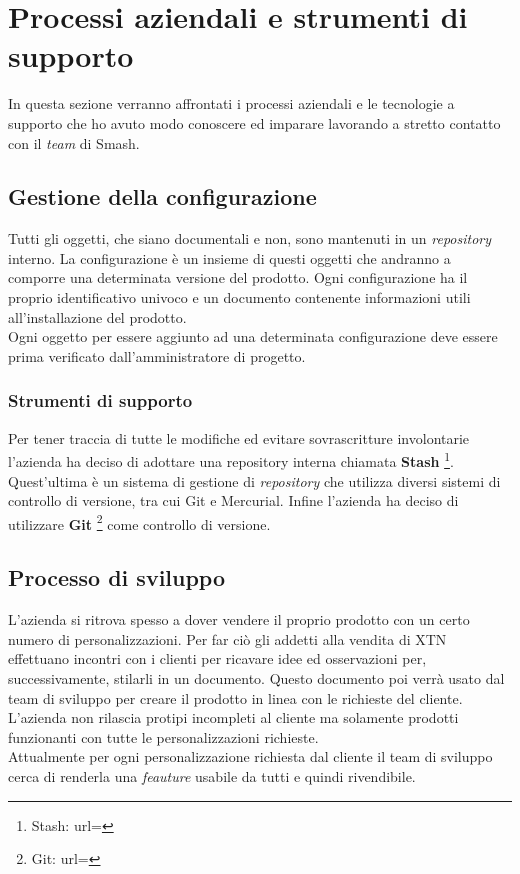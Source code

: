 \section{Processi aziendali e strumenti di supporto}
In questa sezione verranno affrontati i processi aziendali e le tecnologie a supporto che ho avuto modo conoscere ed imparare lavorando a stretto contatto con il \textit{team} di Smash\textregistered.

\subsection{Gestione della configurazione}
Tutti gli oggetti, che siano documentali e non, sono mantenuti in un \textit{repository} interno. La configurazione è un insieme di questi oggetti che andranno a comporre una determinata versione del prodotto. Ogni configurazione ha il proprio identificativo univoco e un documento contenente informazioni utili all'installazione del prodotto.\\
Ogni oggetto per essere aggiunto ad una determinata configurazione deve essere prima verificato dall'amministratore di progetto.
\subsubsection{Strumenti di supporto}
Per tener traccia di tutte le modifiche ed evitare sovrascritture involontarie l'azienda ha deciso di adottare una repository interna chiamata \textbf{Stash} \footnote{Stash: url= }. Quest'ultima è un sistema di gestione di \textit{repository} che utilizza diversi sistemi di controllo di versione, tra cui Git e Mercurial. Infine l'azienda ha deciso di utilizzare \textbf{Git} \footnote{Git: url= } come controllo di versione.
\subsection{Processo di sviluppo}
L'azienda si ritrova spesso a dover vendere il proprio prodotto con un certo numero di personalizzazioni. Per far ciò gli addetti alla vendita di XTN effettuano incontri con i clienti per ricavare idee ed osservazioni per, successivamente, stilarli in un documento. Questo documento poi verrà usato dal team di sviluppo per creare il prodotto in linea con le richieste del cliente.\\
L'azienda non rilascia protipi incompleti al cliente ma solamente prodotti funzionanti con tutte le personalizzazioni richieste.\\
Attualmente per ogni personalizzazione richiesta dal cliente il team di sviluppo cerca di renderla una \textit{feauture} usabile da tutti e quindi rivendibile.
